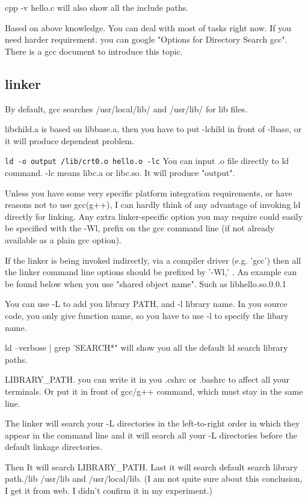 \documentclass[paper=8.5in:11in, twoside, 12pt, pagesize=pdftex]{book}
\begin{document}
	cpp -v hello.c will also show all the include paths. 

	Based on above knowledge. You can deal with most of tasks right now. If you need harder requirement. you can google "Options for Directory Search gcc". There is a gcc document to introduce this topic.  
		
\subsection{linker}
	By default, gcc searches /usr/local/lib/ and /usr/lib/ for lib files.
			 
	libchild.a is based on libbase.a, then you have to put -lchild in front of -lbase, or it will produce dependent problem. 
			 
	\verb=ld -o output /lib/crt0.o hello.o -lc= You can input .o file directly to ld command. -lc means libc.a or libc.so. It will produce "output". 
					 
	Unless you have some very specific platform integration requirements, or have reasons not to use gcc(g++), I can hardly think of any advantage of invoking ld directly for linking. Any extra linker-specific option you may require could easily be specified with the -Wl, prefix on the gcc command line (if not already available as a plain gcc option).

	If the linker is being invoked indirectly, via a compiler driver (e.g. 'gcc') then all the linker command line options should be prefixed by '-Wl,' . An example can be found below when you use "shared object name". Such as libhello.so.0.0.1

   You can use -L to add you library PATH, and -l library name. In you source code, you only give function name, so you have to use -l to specify the libary name. 

	ld --verbose | grep 'SEARCH*" will show you all the default ld search library paths.
			
   LIBRARY\_PATH. you can write it in you .cshrc or .bashrc to affect all your terminals. Or put it in front of gcc/g++ command, which must stay in the same line.        
	 
	The linker will search your -L directories in the left-to-right order in which they appear in the command line and it will search all your -L directories before the default linkage directories.
	
	Then It will search LIBRARY\_PATH. Last it will search default search library path./lib /usr/lib and /usr/local/lib. (I am not quite sure about this conclusion, I get it from web. I didn't confirm it in my experiment.)
	
\end{document}
